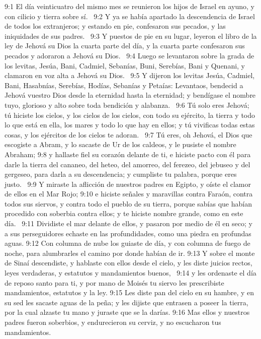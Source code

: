 9:1 El día veinticuatro del mismo mes se reunieron los hijos de Israel en ayuno, y con cilicio y tierra sobre sí.  
9:2 Y ya se había apartado la descendencia de Israel de todos los extranjeros; y estando en pie, confesaron sus pecados, y las iniquidades de sus padres.  
9:3 Y puestos de pie en su lugar, leyeron el libro de la ley de Jehová su Dios la cuarta parte del día, y la cuarta parte confesaron sus pecados y adoraron a Jehová su Dios.  
9:4 Luego se levantaron sobre la grada de los levitas, Jesúa, Bani, Cadmiel, Sebanías, Buni, Serebías, Bani y Quenani, y clamaron en voz alta a Jehová su Dios.  
9:5 Y dijeron los levitas Jesúa, Cadmiel, Bani, Hasabnías, Serebías, Hodías, Sebanías y Petaías: Levantaos, bendecid a Jehová vuestro Dios desde la eternidad hasta la eternidad; y bendígase el nombre tuyo, glorioso y alto sobre toda bendición y alabanza.  
9:6 Tú solo eres Jehová; tú hiciste los cielos, y los cielos de los cielos, con todo su ejército, la tierra y todo lo que está en ella, los mares y todo lo que hay en ellos; y tú vivificas todas estas cosas, y los ejércitos de los cielos te adoran.  
9:7 Tú eres, oh Jehová, el Dios que escogiste a Abram, y lo sacaste de Ur de los caldeos, y le pusiste el nombre Abraham; 
9:8 y hallaste fiel su corazón delante de ti, e hiciste pacto con él para darle la tierra del cananeo, del heteo, del amorreo, del ferezeo, del jebuseo y del gergeseo, para darla a su descendencia; y cumpliste tu palabra, porque eres justo.  
9:9 Y miraste la aflicción de nuestros padres en Egipto, y oíste el clamor de ellos en el Mar Rojo; 
9:10 e hiciste señales y maravillas contra Faraón, contra todos sus siervos, y contra todo el pueblo de su tierra, porque sabías que habían procedido con soberbia contra ellos; y te hiciste nombre grande, como en este día.  
9:11 Dividiste el mar delante de ellos, y pasaron por medio de él en seco; y a sus perseguidores echaste en las profundidades, como una piedra en profundas aguas. 
9:12 Con columna de nube los guiaste de día, y con columna de fuego de noche, para alumbrarles el camino por donde habían de ir. 
9:13 Y sobre el monte de Sinaí descendiste, y hablaste con ellos desde el cielo, y les diste juicios rectos, leyes verdaderas, y estatutos y mandamientos buenos,  
9:14 y les ordenaste el día de reposo santo para ti, y por mano de Moisés tu siervo les prescribiste mandamientos, estatutos y la ley. 
9:15 Les diste pan del cielo en su hambre, y en su sed les sacaste aguas de la peña; y les dijiste que entrasen a poseer la tierra, por la cual alzaste tu mano y juraste que se la darías. 
9:16 Mas ellos y nuestros padres fueron soberbios, y endurecieron su cerviz, y no escucharon tus mandamientos.  
